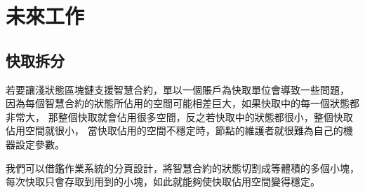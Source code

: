\chapter{未來工作}
\label{c:future_work}

\section{快取拆分}

若要讓淺狀態區塊鏈支援智慧合約，單以一個賬戶為快取單位會導致一些問題，
因為每個智慧合約的狀態所佔用的空間可能相差巨大，如果快取中的每一個狀態都非常大，
那整個快取就會佔用很多空間，反之若快取中的狀態都很小，整個快取佔用空間就很小，
當快取佔用的空間不穩定時，節點的維護者就很難為自己的機器設定參數。

我們可以借鑑作業系統的分頁設計，將智慧合約的狀態切割成等體積的多個小塊，
每次快取只會存取到用到的小塊，如此就能夠使快取佔用空間變得穩定。

